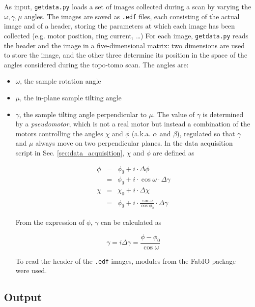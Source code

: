 \documentclass[11pt]{scrartcl}
\begin{document}
As input, {\texttt{getdata.py}} loads a set of images collected during a scan by varying the $\omega, \gamma, \mu$ angles. The images are saved as {\texttt{.edf}} files, each consisting of the actual image and of a header, storing the parameters at which each image has been collected (e.g. motor position, ring current, \ldots) For each image, {\texttt{getdata.py}} reads the header and the image in a five-dimensional matrix: two dimensions are used to store the image, and the other three determine its position in the space of the angles considered during the topo-tomo scan. The angles are:
\begin{itemize}
    \item $\omega$, the sample rotation angle
    \item $\mu$, the in-plane sample tilting angle
    \item $\gamma$, the sample tilting angle perpendicular to $\mu$. The value of $\gamma$ is determined by a {\emph{pseudomotor}}, which is not a real motor but instead a combination of the motors controlling the angles $\chi$ and $\phi$ (a.k.a. $\alpha$ and $\beta$), regulated so that $\gamma$ and $\mu$ always move on two perpendicular planes. In the data acquisition script in Sec. \ref{sec:data_acquisition}, $\chi$ and $\phi$ are defined as 
    
    \begin{eqnarray}
        \phi & = & \phi_0 + i \cdot \Delta \phi \label{eq:phi} \\ 
             & = & \phi_0 + i \cdot \cos\omega \cdot \Delta\gamma \\
        \chi & = & \chi_0 + i \cdot \Delta \chi \label{eq:chi} \\
             & = & \phi_0 + i \cdot \frac{\sin\omega}{\cos\phi_0} \cdot \Delta\gamma
    \end{eqnarray}
    
    From the expression of $\phi$, $\gamma$ can be calculated as 
 
    \begin{equation}
        \gamma = i \Delta\gamma = \frac{\phi - \phi_0}{\cos\omega}
    \end{equation}
    
    To read the header of the {\texttt{.edf}} images, modules from the FabIO\cite{knudsen2013fabio} package were used.
    
\end{itemize}

\subsection{Output}
\end{document}
